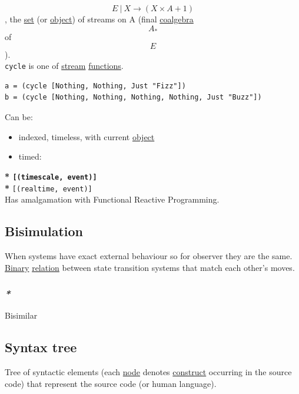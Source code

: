 \documentclass[11pt]{article}
\begin{document}
$$ E \ | \ X \to (X \times A + 1) $$, the \hyperref[org1faf06d]{set} (or \hyperref[org4be0e9d]{object}) of streams on A (final \hyperref[org4a1da7b]{coalgebra} $$ A_{*} $$ of $$ E $$).\\

\texttt{cycle} is one of \hyperref[orga8ddce6]{stream} \hyperref[orgaa8fb87]{functions}.\\
\begin{verbatim}
a = (cycle [Nothing, Nothing, Just "Fizz"])
b = (cycle [Nothing, Nothing, Nothing, Nothing, Just "Buzz"])
\end{verbatim}

Can be:\\
\begin{itemize}
\item indexed, timeless, with current \hyperref[org4be0e9d]{object}\\
\item timed:\\
\end{itemize}
\textbf{* \texttt{[(timescale, event)]}\\
*} \texttt{[(realtime, event)]}\\

Has amalgamation with Functional Reactive Programming.\\

\subsection{\label{orgcd2667a}Bisimulation}
\label{sec:orga6770eb}
When systems have exact external behaviour so for observer they are the same.\\

\hyperref[org57bd48f]{Binary} \hyperref[orga5705a9]{relation} between state transition systems that match each other's moves.\\

\subsubsection{\emph{*}}
\label{sec:orga47521f}

\label{org1b1bbc0}Bisimilar\\

\subsection{\label{orgda43e7b}Syntax tree}
\label{sec:orga458a8b}
Tree of syntactic elements (each \hyperref[org60b23d6]{node} denotes \hyperref[org3eb9b19]{construct} occurring in the source code) that represent the source code (or human language).\\
\end{document}
